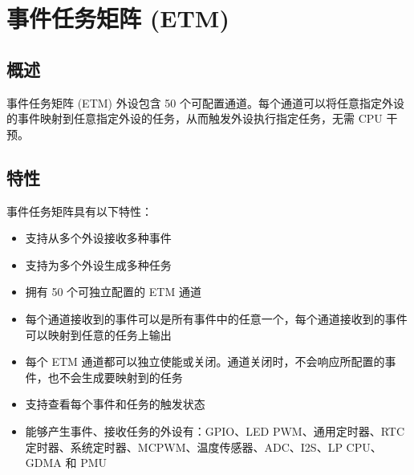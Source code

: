\documentclass[main\_\_CN.tex]{subfiles}
\begin{document}

\ifglobal
\else
    \listoftodos
    {\let\clearpage\relax \listofdonetodos}
    \tableofcontents
\fi


\newcommand{\regfieldrotate}[1]{\regfield{\rotatebox{20}{#1}}}



\hypertarget{evntaskmatrix}{}
\chapter{事件任务矩阵 (ETM)}
\label{mod:evntaskmatrix}



\section{概述}
事件任务矩阵 (ETM) 外设包含 50 个可配置通道。每个通道可以将任意指定外设的事件映射到任意指定外设的任务，从而触发外设执行指定任务，无需 CPU 干预。


\section{特性}
\label{sec:evntaskmatrix-features}

事件任务矩阵具有以下特性：
\begin{itemize}
    \item 支持从多个外设接收多种事件
    \item 支持为多个外设生成多种任务
    \item 拥有 50 个可独立配置的 ETM 通道
    \item 每个通道接收到的事件可以是所有事件中的任意一个，每个通道接收到的事件可以映射到任意的任务上输出
    \item 每个 ETM 通道都可以独立使能或关闭。通道关闭时，不会响应所配置的事件，也不会生成要映射到的任务
    \item 支持查看每个事件和任务的触发状态
    \item 能够产生事件、接收任务的外设有：GPIO、LED PWM、通用定时器、RTC 定时器、系统定时器、MCPWM、温度传感器、ADC、I2S、LP CPU、GDMA 和 PMU
\end{itemize}
\end{document}
